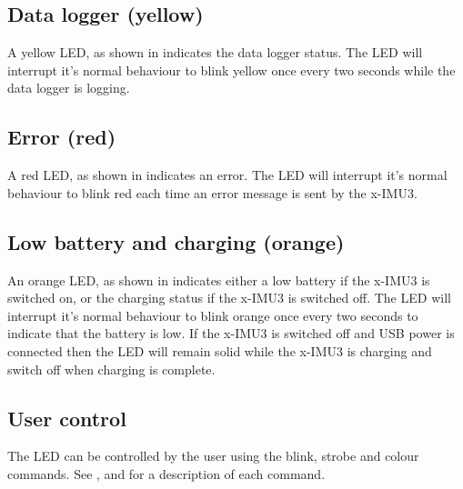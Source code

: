 
\subsection{Data logger (yellow)}

A yellow \ac{LED}, as shown in  indicates the data logger status.  The \ac{LED} will interrupt it's normal behaviour to blink yellow once every two seconds while the data logger is logging.


\subsection{Error (red)}

A red \ac{LED}, as shown in  indicates an error.  The \ac{LED} will interrupt it's normal behaviour to blink red each time an error message is sent by the x-IMU3.


\subsection{Low battery and charging (orange)}

An orange \ac{LED}, as shown in  indicates either a low battery if the x-IMU3 is switched on, or the charging status if the x-IMU3 is switched off.  The \ac{LED} will interrupt it's normal behaviour to blink orange once every two seconds to indicate that the battery is low.  If the x-IMU3 is switched off and USB power is connected then the \ac{LED} will remain solid while the x-IMU3 is charging and switch off when charging is complete.


\subsection{User control}

The \ac{LED} can be controlled by the user using the blink, strobe and colour commands.  See ,  and  for a description of each command.
